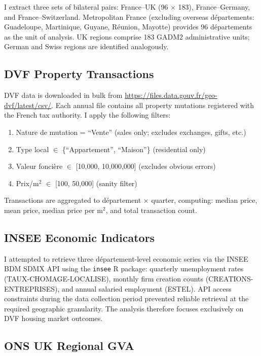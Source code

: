 \documentclass[12pt]{article}
\newcommand{\EUR}[1]{\texteuro{}#1}
\begin{document}
I extract three sets of bilateral pairs: France--UK (96 $\times$ 183), France--Germany, and France--Switzerland. Metropolitan France (excluding overseas d\'epartements: Guadeloupe, Martinique, Guyane, R\'eunion, Mayotte) provides 96 d\'epartements as the unit of analysis. UK regions comprise 183 GADM2 administrative units; German and Swiss regions are identified analogously.

\subsection{DVF Property Transactions}

DVF data is downloaded in bulk from \url{https://files.data.gouv.fr/geo-dvf/latest/csv/}. Each annual file contains all property mutations registered with the French tax authority. I apply the following filters:

\begin{enumerate}
\item Nature de mutation = ``Vente'' (sales only; excludes exchanges, gifts, etc.)
\item Type local $\in$ \{``Appartement'', ``Maison''\} (residential only)
\item Valeur fonci\`ere $\in$ [\EUR{10,000}, \EUR{10,000,000}] (excludes obvious errors)
\item Prix/m$^2$ $\in$ [\EUR{100}, \EUR{50,000}] (sanity filter)
\end{enumerate}

Transactions are aggregated to d\'epartement $\times$ quarter, computing: median price, mean price, median price per m$^2$, and total transaction count.

\subsection{INSEE Economic Indicators}

I attempted to retrieve three d\'epartement-level economic series via the INSEE BDM SDMX API using the \texttt{insee} R package: quarterly unemployment rates (TAUX-CHOMAGE-LOCALISE), monthly firm creation counts (CREATIONS-ENTREPRISES), and annual salaried employment (ESTEL). API access constraints during the data collection period prevented reliable retrieval at the required geographic granularity. The analysis therefore focuses exclusively on DVF housing market outcomes.

\subsection{ONS UK Regional GVA}
\end{document}
